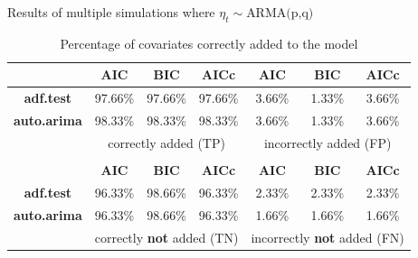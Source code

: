 \documentclass[10pt]{beamer}
\begin{document}
\begin{frame}{Results of multiple simulations where $\eta_t\sim\text{ARMA(p,q)}$}

    \begin{table}
        \centering\small 
        \label{simulations1}
        \caption{Percentage of covariates correctly added to the model}
        \begin{tabular}{|c|ccc|ccc|}
            \cline{2-7}
            \multicolumn{1}{c|}{}   & \textbf{AIC}  & \textbf{BIC}  & \textbf{AICc}            & \textbf{AIC}      & \textbf{BIC}   & \textbf{AICc} \\
            \hline       
            \textbf{adf.test}       & 97.66\%       & 97.66\%        & 97.66\%                 & 3.66\%            & 1.33\%         & 3.66\%        \\
            \textbf{auto.arima}     & 98.33\%       & 98.33\%        & 98.33\%                 & 3.66\%            & 1.33\%         & 3.66\%        \\
            \hline
            \multicolumn{1}{|c|}{}   & \multicolumn{3}{c|}{correctly added (TP)}               & \multicolumn{3}{c|}{incorrectly added (FP)}         \\
            \hline 
            \multicolumn{7}{c}{}                                                                                                                    \\
            \cline{2-7}
            \multicolumn{1}{c|}{}   & \textbf{AIC}  & \textbf{BIC}  & \textbf{AICc}           & \textbf{AIC}      & \textbf{BIC}   & \textbf{AICc}  \\ 
            \hline        
            \textbf{adf.test}       & 96.33\%       & 98.66\%        & 96.33\%                & 2.33\%            & 2.33\%         & 2.33\%         \\
            \textbf{auto.arima}     & 96.33\%       & 98.66\%        & 96.33\%                & 1.66\%            & 1.66\%         & 1.66\%         \\
            \hline 
            \multicolumn{1}{|c|}{}   & \multicolumn{3}{c|}{correctly \textbf{not} added (TN)} & \multicolumn{3}{c|}{incorrectly \textbf{not} added (FN)}  \\
            \hline
        \end{tabular}
    \end{table}

    
    
\end{frame}
\end{document}
